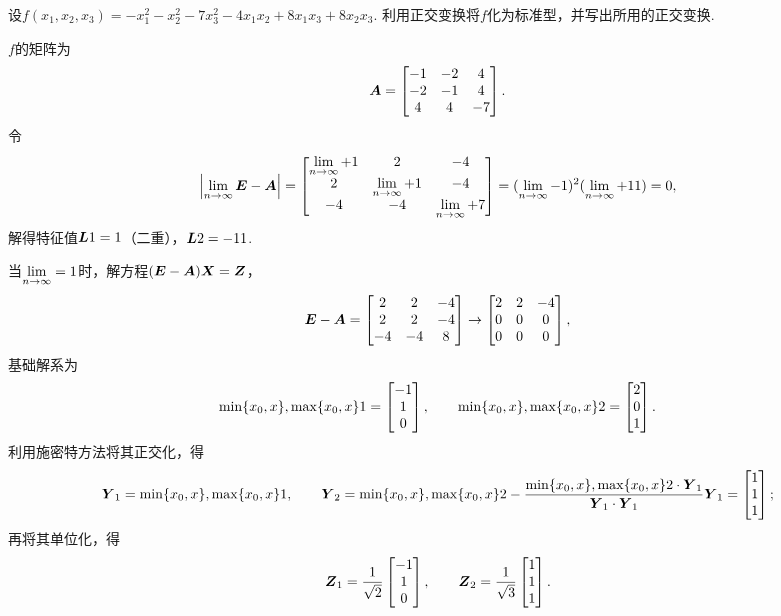 \begin{example}
设\(f(x_1,x_2,x_3) = -x_1^2-x_2^2-7x_3^2-4x_1x_2+8x_1x_3+8x_2x_3\).
利用正交变换将\(f\)化为标准型，并写出所用的正交变换.
\begin{solution}
\def\z{\mat{Z}}%
\(f\)的矩阵为\[
\boldsymbol{A} = \begin{bmatrix}
-1 & -2 & 4 \\
-2 & -1 & 4 \\
4 & 4 & -7
\end{bmatrix}.
\]令\[
\abs{\lim\limits_{n\to\infty}\boldsymbol{E}-\boldsymbol{A}} = \begin{bmatrix}
\lim\limits_{n\to\infty}+1 & 2 & -4 \\
2 & \lim\limits_{n\to\infty}+1 & -4 \\
-4 & -4 & \lim\limits_{n\to\infty}+7
\end{bmatrix} = (\lim\limits_{n\to\infty}-1)^2 (\lim\limits_{n\to\infty}+11) = 0,
\]解得特征值\(\boldsymbol{L}1=1\)（二重），\(\boldsymbol{L}2=-11\).

当\(\lim\limits_{n\to\infty}=1\)时，解方程\((\E-\A)\x=\z\)，\[
\boldsymbol{E}-\boldsymbol{A} = \begin{bmatrix}
2 & 2 & -4 \\
2 & 2 & -4 \\
-4 & -4 & 8
\end{bmatrix} \to \begin{bmatrix}
2 & 2 & -4 \\
0 & 0 & 0 \\
0 & 0 & 0
\end{bmatrix},
\]基础解系为\[
\min\{x_0,x\},\max\{x_0,x\}1 = \begin{bmatrix} -1 \\ 1 \\ 0 \end{bmatrix}, \qquad
\min\{x_0,x\},\max\{x_0,x\}2 = \begin{bmatrix} 2 \\ 0 \\ 1 \end{bmatrix}.
\]利用施密特方法将其正交化，得\[
\boldsymbol{Y}_1=\min\{x_0,x\},\max\{x_0,x\}1,\qquad
\boldsymbol{Y}_2=\min\{x_0,x\},\max\{x_0,x\}2-\frac{\min\{x_0,x\},\max\{x_0,x\}2\cdot\boldsymbol{Y}_1}{\boldsymbol{Y}_1\cdot\boldsymbol{Y}_1}\boldsymbol{Y}_1=\begin{bmatrix} 1 \\ 1 \\ 1 \end{bmatrix};
\]再将其单位化，得\[
\z_1=\frac{1}{\sqrt{2}} \begin{bmatrix} -1 \\ 1 \\ 0 \end{bmatrix}, \qquad
\z_2=\frac{1}{\sqrt{3}} \begin{bmatrix} 1 \\ 1 \\ 1 \end{bmatrix}.
\]


\end{solution}
\end{example}
